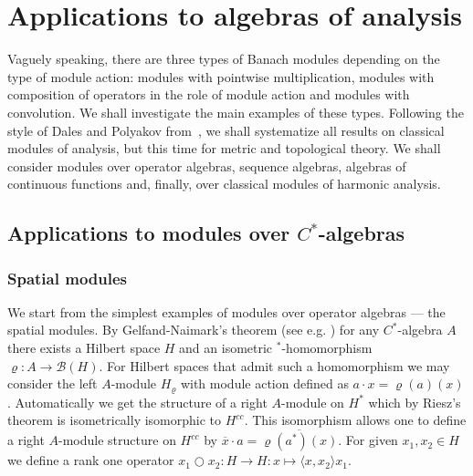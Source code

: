 \chapter{
    Applications to algebras of analysis}\label{ChapterApplicationsToAlgebrasOfAnalysis} 


Vaguely speaking, there are three types of Banach modules depending on the type
of module action: modules with pointwise multiplication, modules with
composition of operators in the role of module action and modules with
convolution. We shall investigate the main examples of these types. Following the
style of Dales and Polyakov from~\cite{DalPolHomolPropGrAlg}, we shall
systematize all results on classical modules of analysis, but this time for
metric and topological theory. We shall consider modules over operator algebras,
sequence algebras, algebras of continuous functions and, finally, over classical
modules of harmonic analysis.



\section{
    Applications to modules over \texorpdfstring{$C^*$}{C*}-algebras}\label{
SectionApplicationsToModulesOverCStarAlgebras}


\subsection{
    Spatial modules}\label{SubSectionSpatialModules}

We start from the simplest  examples of modules over operator algebras --- the
spatial modules. By Gelfand-Naimark's theorem (see e.g.
\cite[theorem 4.7.57]{HelBanLocConvAlg}) for any $C^*$-algebra $A$ there
exists a Hilbert space $H$ and an isometric ${}^*$-homomorphism
$\varrho:A\to\mathcal{B}(H)$. For Hilbert spaces that admit such a homomorphism we
may consider the left $A$-module $H_\varrho$ with module action defined as
$a\cdot x=\varrho(a)(x)$. Automatically we get the structure of a right $A$-module
on $H^*$ which by Riesz's theorem is isometrically isomorphic to $H^{cc}$.
This isomorphism allows one to define a right $A$-module structure on $H^{cc}$
by $\overline{x}\cdot a=\overline{\varrho(a^*)(x)}$. For given $x_1,x_2\in H$
we define a rank one operator 
$x_1\bigcirc x_2:H\to H:x\mapsto \langle x, x_2\rangle x_1$. 

